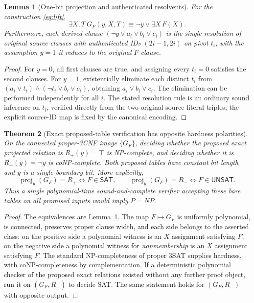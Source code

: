 \documentclass[11pt]{article}
\newtheorem{theorem}{Theorem}
\newtheorem{lemma}[theorem]{Lemma}
\newcommand{\SAT}{\mathsf{SAT}}
\newcommand{\UNSAT}{\mathsf{UNSAT}}
\newcommand{\proj}{\operatorname{proj}}
\begin{document}
\begin{lemma}[One-bit projection and authenticated resolvents]\label{lem:projection}
For the construction \eqref{eq:lift},
\[
\exists X,T\ G_F(y,X,T)\equiv
\neg y\vee \exists X\,F(X).
\]
Furthermore, each derived clause $(\neg y\vee a_i\vee b_i\vee c_i)$ is the single resolution of original source clauses with authenticated IDs $(2i-1,2i)$ on pivot $t_i$; with the assumption $y=1$ it reduces to the original $F$ clause.
\end{lemma}
\begin{proof}
For $y=0$, all first clauses are true, and assigning every $t_i=0$ satisfies the second clauses. For $y=1$, existentially eliminate each distinct $t_i$ from $(a_i\vee t_i)\wedge(\neg t_i\vee b_i\vee c_i)$, obtaining $a_i\vee b_i\vee c_i$. The elimination can be performed independently for all $i$. The stated resolution rule is an ordinary sound inference on $t_i$, verified directly from the two original source literal triples; the explicit source-ID map is fixed by the canonical encoding.
\end{proof}

\begin{theorem}[Exact proposed-table verification has opposite hardness polarities]\label{thm:polarity}
On the connected proper-3CNF image $\{G_F\}$, deciding whether the \emph{proposed exact} projected relation is $R_{+}(y)=\top$ is NP-complete, and deciding whether it is $R_{-}(y)=\neg y$ is coNP-complete. Both proposed tables have constant bit length and $y$ is a single boundary bit. More explicitly,
\[
\proj_y(G_F)=R_+\iff F\in\SAT,
\qquad
\proj_y(G_F)=R_-\iff F\in\UNSAT.
\]
Thus a single polynomial-time sound-and-complete verifier accepting these \emph{bare tables} on all promised inputs would imply $P=NP$.
\end{theorem}
\begin{proof}
The equivalences are Lemma~\ref{lem:projection}. The map $F\mapsto G_F$ is uniformly polynomial, is connected, preserves proper clause width, and each side belongs to the asserted class: on the positive side a polynomial witness is an $X$ assignment satisfying $F$, on the negative side a polynomial witness for \emph{nonmembership} is an $X$ assignment satisfying $F$. The standard NP-completeness of proper 3SAT supplies hardness, with coNP-completeness by complementation. If a deterministic polynomial checker of the proposed exact relations existed without any further proof object, run it on $(G_F,R_+)$ to decide SAT. The same statement holds for $(G_F,R_-)$ with opposite output.
\end{proof}
\end{document}
